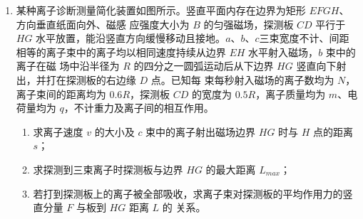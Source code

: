 \begin{enumerate}


\newpage
\item 
某种离子诊断测量简化装置如图所示。竖直平面内存在边界为矩形 $ EFGH $、方向垂直纸面向外、磁感
应强度大小为 $ B $ 的匀强磁场，探测板 $ CD $ 平行于 $ HG $ 水平放置，能沿竖直方向缓慢移动且接地。$ a $、$ b $、$ c $三束宽度不计、间距相等的离子束中的离子均以相同速度持续从边界 $ EH $ 水平射入磁场，$ b $ 束中的离子在磁
场中沿半径为 $ R $ 的四分之一圆弧运动后从下边界 $ HG $ 竖直向下射出，并打在探测板的右边缘 $ D $ 点。已知每
束每秒射入磁场的离子数均为 $ N $，离子束间的距离均为 $ 0.6R $，探测板 $ CD $ 的宽度为 $ 0.5R $，离子质量均为
$ m $、电荷量均为 $ q $，不计重力及离子间的相互作用。
\begin{enumerate}
\item
求离子速度 $ v $ 的大小及 $ c $ 束中的离子射出磁场边界 $ HG $ 时与 $ H $ 点的距离 $ s $；



\item 
求探测到三束离子时探测板与边界 $ HG $ 的最大距离 $ L_{max} $；



\item 
若打到探测板上的离子被全部吸收，求离子束对探测板的平均作用力的竖直分量 $ F $ 与板到 $ HG $ 距离 $ L $ 的
关系。


\end{enumerate}
\begin{figure}[h!]
\flushright

\end{figure}





\end{enumerate}


